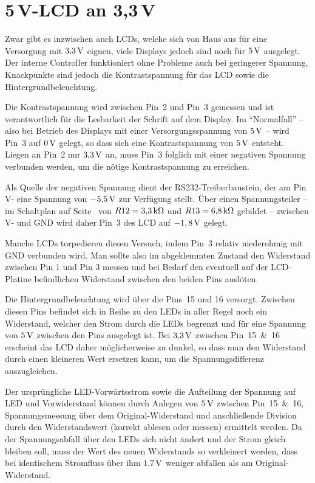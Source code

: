 \documentclass[pdftex, parskip, numbers=noenddot, toc=listof]{scrbook}
\begin{document}
		\section[5V-LCD an 3,3V]{5\,V-LCD an 3{,}3\,V}

			Zwar gibt es inzwischen auch LCDs, welche sich von Haus aus für eine Versorgung mit $\unit[3{,}3]{V}$ eignen, viele Displays jedoch sind noch für $\unit[5]{V}$ ausgelegt. Der interne Controller funktioniert ohne Probleme auch bei geringerer Spannung, Knackpunkte sind jedoch die Kontrastspannung für das LCD sowie die Hintergrundbeleuchtung.

			Die Kontrastspannung wird zwischen Pin~2 und Pin~3 gemessen und ist verantwortlich für die Lesbarkeit der Schrift auf dem Display. Im \enquote{Normalfall} -- also bei Betrieb des Displays mit einer Versorgungsspannung von $\unit[5]{V}$ -- wird Pin~3 auf $\unit[0]{V}$ gelegt, so dass sich eine Kontrastspannung von $\unit[5]{V}$ entsteht. Liegen an Pin~2 nur $\unit[3{,}3]{V}$ an, muss Pin~3 folglich mit einer negativen Spannung verbunden werden, um die nötige Kontrastspannung zu erreichen.

			Als Quelle der negativen Spannung dient der RS232-Treiberbaustein, der am Pin V- eine Spannung von $\unit[-5{,}5]{V}$ zur Verfügung stellt. Über einen Spannungsteiler -- im Schaltplan auf Seite~\pageref{fig:transmitterschematic} von $R12 = \unit[3{,}3]{k\Omega}$ und $R13 = \unit[6{,}8]{k\Omega}$ gebildet -- zwischen V- und GND wird daher Pin~3 des LCD auf $\unit[-1,8]{V}$ gelegt.

			Manche LCDs torpedieren diesen Versuch, indem Pin~3 relativ niederohmig mit GND verbunden wird. Man sollte also im abgeklemmten Zustand den Widerstand zwischen Pin 1 und Pin 3 messen und bei Bedarf den eventuell auf der LCD-Platine befindlichen Widerstand zwischen den beiden Pins auslöten.

			Die Hintergrundbeleuchtung wird über die Pins~15 und 16 versorgt. Zwischen diesen Pins befindet sich in Reihe zu den LEDs in aller Regel noch ein Widerstand, welcher den Strom durch die LEDs begrenzt und für eine Spannung von $\unit[5]{V}$ zwischen den Pins ausgelegt ist. Bei $\unit[3{,}3]{V}$ zwischen Pin~15~\&~16 erscheint das LCD daher möglicherweise zu dunkel, so dass man den Widerstand durch einen kleineren Wert ersetzen kann, um die Spannungsdifferenz auszugleichen.

			Der ursprüngliche LED-Vorwärtsstrom sowie die Aufteilung der Spannung auf LED und Vorwiderstand können durch Anlegen von $\unit[5]{V}$ zwischen Pin~15~\&~16, Spannungsmessung über dem Original-Widerstand und anschließende Division durch den Widerstandswert (korrekt ablesen oder messen) ermittelt werden. Da der Spannungsabfall über den LEDs sich nicht ändert und der Strom gleich bleiben soll, muss der Wert des neuen Widerstands so verkleinert werden, dass bei identischem Stromfluss über ihm $\unit[1{,}7]{V}$ weniger abfallen als am Original-Widerstand.
\end{document}
